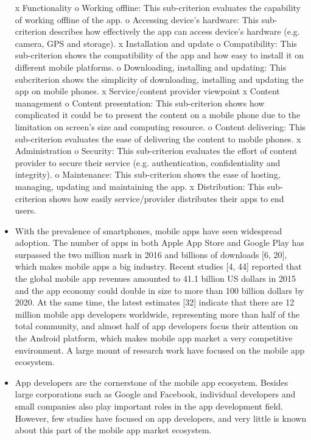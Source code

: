 \begin{itemize}
        x Functionality
            o Working offline: This sub-criterion evaluates the capability of working offline of the app.
            o Accessing device’s hardware: This sub-criterion describes how effectively the app can access device’s hardware (e.g. camera, GPS and storage).
        x Installation and update
            o Compatibility: This sub-criterion shows the compatibility of the app and how easy to install it on different mobile platforms.
            o Downloading, installing and updating: This subcriterion shows the simplicity of downloading, installing and updating the app on mobile phones.
        x Service/content provider viewpoint
        x Content management
            o Content presentation: This sub-criterion shows how complicated it could be to present the content on a mobile phone due to the limitation on screen’s size and computing resource.
            o Content delivering: This sub-criterion evaluates the ease of delivering the content to mobile phones.
        x Administration
            o Security: This sub-criterion evaluates the effort of content provider to secure their service (e.g. authentication, confidentiality and integrity).
          o Maintenance: This sub-criterion shows the ease of hosting, managing, updating and maintaining the app.
        x Distribution: This sub-criterion shows how easily service/provider distributes their apps to end users.\cite{Mobile_App_Paradigms}
        \item
        With the prevalence of smartphones, mobile apps have seen widespread adoption. The number of apps in both Apple App Store and Google Play has surpassed the two million mark in 2016 and billions of downloads [6, 20], which makes mobile apps a big industry. Recent studies [4, 44] reported that the global mobile app revenues amounted to 41.1 billion US dollars in 2015 and the app economy could double in size to more than 100 billion dollars by 2020. At the same time, the latest estimates [32] indicate that there are 12 million mobile app developers worldwide, representing more than half of the total community, and almost half of app developers focus their attention on the Android platform, which makes mobile app market a very competitive environment. A large mount of research work have focused on the mobile app ecosystem. \cite{Mobile_App_Ecosystem}
        \item
        App developers are the cornerstone of the mobile app ecosystem. Besides large corporations such as Google and Facebook, individual developers and small companies also play important roles in the app development field. However, few studies have focused on app developers, and very little is known about this part of the mobile app market ecosystem.\cite{Mobile_App_Ecosystem}

\end{itemize}
